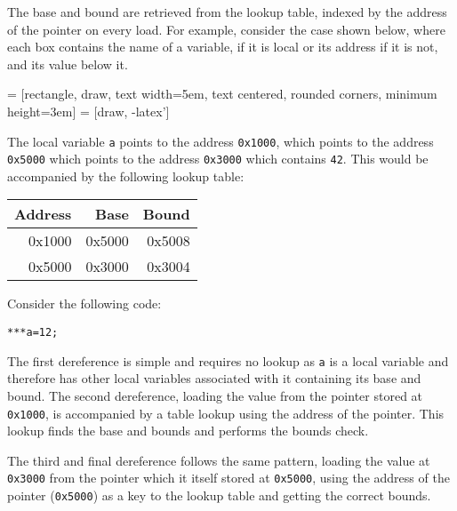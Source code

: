 The base and bound are retrieved from the lookup table, indexed by the address of the pointer on every load.
For example, consider the case shown below, where each box contains the name of a variable, if it is local or its address if it is not, and its value below it. 

\noindent
{} = [rectangle, draw, 
    text width=5em, text centered, rounded corners, minimum height=3em]
 = [draw, -latex']

The local variable \verb!a! points to the address \verb!0x1000!, which points to the address \verb!0x5000! which points to the address \verb!0x3000! which contains \verb!42!. This would be accompanied by the following lookup table:

\noindent
\begin{tabular}{|r|r|r|}
\hline Address & Base & Bound \\
\hline 0x1000 & 0x5000 & 0x5008 \\
\hline 0x5000 & 0x3000 & 0x3004 \\
\hline
\end{tabular}

Consider the following code:

\begin{verbatim}
***a=12;
\end{verbatim}

The first dereference is simple and requires no lookup as \verb!a! is a local variable and therefore has other local variables associated with it containing its base and bound.
The second dereference, loading the value from the pointer stored at \verb!0x1000!, is accompanied by a table lookup using the address of the pointer.
This lookup finds the base and bounds and performs the bounds check.

The third and final dereference follows the same pattern, loading the value at \verb!0x3000! from the pointer which it itself stored at \verb!0x5000!, using the address of the pointer (\verb!0x5000!) as a key to the lookup table and getting the correct bounds.

